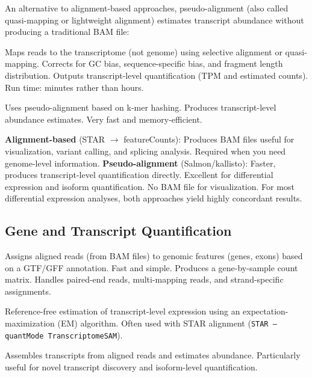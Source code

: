 An alternative to alignment-based approaches, pseudo-alignment (also called
quasi-mapping or lightweight alignment) estimates transcript abundance without
producing a traditional BAM file:

\begin{description}[style=nextline]
  \item[\software{Salmon}] Maps reads to the transcriptome (not genome) using
    selective alignment or quasi-mapping. Corrects for GC bias, sequence-specific
    bias, and fragment length distribution. Outputs transcript-level
    quantification (TPM and estimated counts). Run time: minutes rather than
    hours.
  \item[\software{kallisto}] Uses pseudo-alignment based on k-mer hashing.
    Produces transcript-level abundance estimates. Very fast and
    memory-efficient.
\end{description}

\begin{keyconcept}[title={Alignment vs. Pseudo-Alignment}]
\textbf{Alignment-based} (STAR $\rightarrow$ featureCounts): Produces BAM files
useful for visualization, variant calling, and splicing analysis. Required when
you need genome-level information. \textbf{Pseudo-alignment} (Salmon/kallisto):
Faster, produces transcript-level quantification directly. Excellent for
differential expression and isoform quantification. No BAM file for
visualization. For most differential expression analyses, both approaches yield
highly concordant results.
\end{keyconcept}

\subsection{Gene and Transcript Quantification}

\begin{description}[style=nextline]
  \item[\software{featureCounts} (Subread package)] Assigns aligned reads (from
    BAM files) to genomic features (genes, exons) based on a GTF/GFF
    annotation. Fast and simple. Produces a gene-by-sample count matrix.
    Handles paired-end reads, multi-mapping reads, and strand-specific
    assignments.
  \item[\software{RSEM}] Reference-free estimation of transcript-level
    expression using an expectation-maximization (EM) algorithm. Often used with
    STAR alignment (\texttt{STAR --quantMode TranscriptomeSAM}).
  \item[\software{StringTie}] Assembles transcripts from aligned reads and
    estimates abundance. Particularly useful for novel transcript discovery and
    isoform-level quantification.
\end{description}

